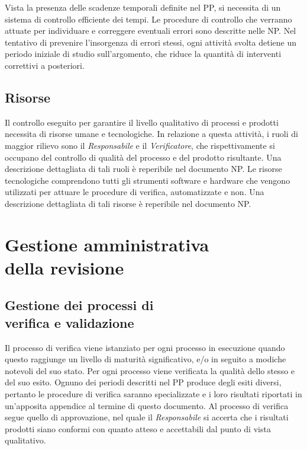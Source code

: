 \documentclass[openany,12pt,a4paper]{report}
\begin{document}
	Vista la presenza delle scadenze temporali definite nel PP, si necessita di un sistema di controllo efficiente dei tempi. Le procedure di controllo che verranno attuate per individuare e correggere eventuali errori sono descritte
	nelle NP. Nel tentativo di prevenire l'insorgenza di errori stessi, ogni attività svolta detiene un periodo iniziale di
	studio sull'argomento, che riduce la quantità di interventi correttivi a posteriori.
	
	\section{Risorse}
	
	Il controllo eseguito per garantire il livello qualitativo di processi e prodotti necessita di risorse umane e tecnologiche. In relazione a questa attività, i ruoli di maggior rilievo sono il \textit{Responsabile} e il \textit{Verificatore}, che rispettivamente si occupano del controllo di qualità del processo e del prodotto risultante. Una descrizione dettagliata di tali ruoli è reperibile nel documento NP. 
	Le risorse tecnologiche comprendono tutti gli strumenti software e hardware che vengono utilizzati per attuare le procedure di verifica, automatizzate e non. Una descrizione dettagliata di tali risorse è reperibile nel documento NP. 
	
\chapter{Gestione amministrativa \\ della revisione}
	
	\section{Gestione dei processi di \\ verifica e validazione}
	
	Il processo di verifica viene istanziato per ogni processo in esecuzione quando questo raggiunge un livello di maturità significativo, e/o in seguito a modiche notevoli del suo stato. Per ogni processo viene verificata la qualità dello stesso e del suo esito. 
	Ognuno dei periodi descritti nel PP produce degli esiti diversi, pertanto le procedure di verifica saranno specializzate e i loro risultati riportati in un'apposita appendice al termine di questo documento. 
	Al processo di verifica segue quello di approvazione, nel quale il \textit{Responsabile} si accerta che i risultati prodotti siano conformi con quanto atteso e accettabili dal punto di vista qualitativo.
	
\end{document}
